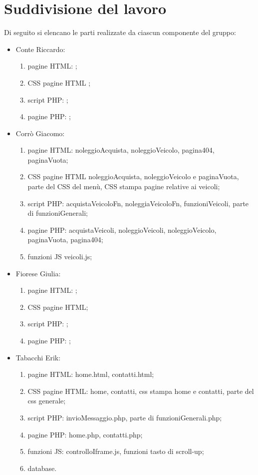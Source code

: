 \section{Suddivisione del lavoro}
Di seguito si elencano le parti realizzate da ciascun componente del gruppo:
\begin{itemize}
    \item Conte Riccardo:
        \begin{enumerate}
        \item pagine HTML: ;
        \item CSS pagine HTML ;
        \item script PHP: ;
        \item pagine PHP: ;
        \end{enumerate}
    \item Corrò Giacomo:
        \begin{enumerate}
            \item pagine HTML: noleggioAcquista, noleggioVeicolo, pagina404, paginaVuota;
            \item CSS pagine HTML noleggioAcquista, noleggioVeicolo e paginaVuota, parte del CSS del menù, CSS stampa pagine relative ai veicoli;
            \item script PHP: acquistaVeicoloFn, noleggiaVeicoloFn, funzioniVeicoli, parte di funzioniGenerali;
            \item pagine PHP: acquistaVeicoli, noleggioVeicoli, noleggioVeicolo, paginaVuota, pagina404;
            \item funzioni JS veicoli.js;
        \end{enumerate}
    \item Fiorese Giulia:
        \begin{enumerate}
            \item pagine HTML: ;
            \item CSS pagine HTML;
            \item script PHP: ;
            \item pagine PHP: ;
        \end{enumerate}
    \item Tabacchi Erik:
        \begin{enumerate}
            \item pagine HTML: home.html, contatti.html;
            \item CSS pagine HTML: home, contatti, css stampa home e contatti, parte del css generale;
            \item script PHP: invioMessaggio.php, parte di funzioniGenerali.php;
            \item pagine PHP: home.php, contatti.php;
            \item funzioni JS: controlloIframe.js, funzioni tasto di scroll-up;
            \item database.
        \end{enumerate}
\end{itemize}
